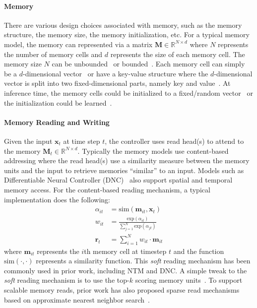 \documentclass[12pt]{thesis-umich}[thesis]
\def\vec#1{\ensuremath{\boldsymbol{{#1}}}}
\begin{document}
\paragraph{Memory} There are various design choices associated with memory, such as the memory structure, the memory size, the memory initialization, etc. For a typical memory model, the memory can represented via a matrix $\vec{M} \in \mathbb{R}^{N \times d}$ where $N$ represents the number of memory cells and $d$ represents the size of each memory cell. 
The memory size $N$ can be unbounded~\cite{weston2014memory, graves2014neural} or bounded~\cite{sukhbaatar-15, henaff2016tracking}. 
Each memory cell can simply be a $d$-dimensional vector~\cite{weston2014memory, sukhbaatar-15} or have a key-value structure where the $d$-dimensional vector is split into two fixed-dimensional parts, namely key and value~\cite{miller-etal-2016-key, henaff2016tracking, liu2019referential}. 
At inference time, the memory cells could be initialized to a fixed/random vector~\cite{graves2014neural, sukhbaatar-15, graves2016hybrid} or the initialization could be learned~\cite{henaff2016tracking, liu2019referential}.

\paragraph{Memory Reading and Writing}
Given the input $\vec{x}_t$ at time step $t$, the controller uses read head(s) to attend to the memory $\vec{M}_{t} \in \mathbb{R}^{N \times d}$. Typically the memory models use content-based addressing where the read head(s) use a  similarity measure between the memory units and the input to retrieve  memories ``similar'' to an input. Models such as Differentiable Neural Controller (DNC)~\cite{graves2016hybrid} also support spatial and temporal memory access. For the content-based reading mechanism, a typical implementation does the following:
\begin{align*}
    \alpha_{it} &= \textrm{sim}(\vec{m}_{it}, \vec{x}_t)\\
    w_{it} &= \frac{\textrm{exp}(\alpha_{it})}{\sum_{j=1}^{N}\textrm{exp} (\alpha_{jt})}\\
    \vec{r}_t &= \sum_{i=1}^N w_{it} \cdot \vec{m}_{it}
\end{align*}
where $\vec{m}_{it}$ represents the $i$th memory cell at timestep $t$ and the function $\textrm{sim}(\cdot, \cdot)$ represents a similarity function. This \emph{soft} reading mechanism has been commonly used in prior work, including NTM and DNC. A simple tweak to the \emph{soft} reading mechanism is to use the top-$k$ scoring memory units~\cite{weston2014memory}.  
To support scalable memory reads, prior work has also proposed sparse read mechanisms based on approximate nearest neighbor search~\cite{weston2014memory, rae2016scaling}. 
\end{document}
